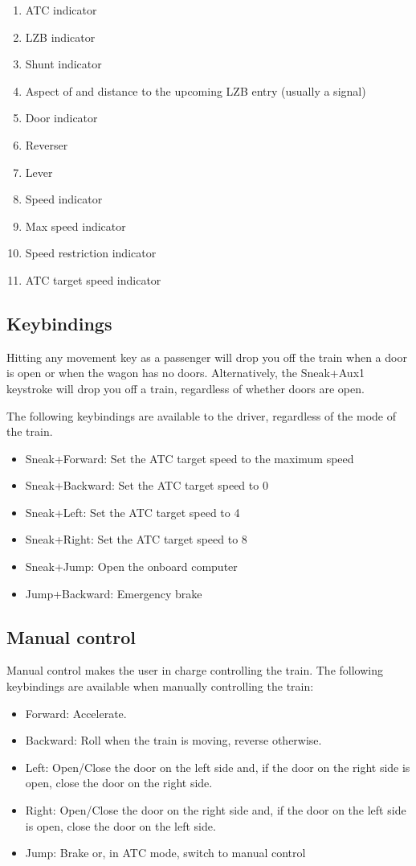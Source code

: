 \documentclass[notitlepage]{article}
\begin{document}
\begin{enumerate}
\item ATC indicator
\item LZB indicator
\item Shunt indicator
\item Aspect of and distance to the upcoming LZB entry (usually a signal)
\item Door indicator
\item Reverser
\item Lever
\item Speed indicator
\item Max speed indicator
\item Speed restriction indicator
\item ATC target speed indicator
\end{enumerate}

\subsection{Keybindings}\label{s:keybindings}
Hitting any movement key as a passenger will drop you off the train when a door is open or when the wagon has no doors. Alternatively, the Sneak+Aux1 keystroke will drop you off a train, regardless of whether doors are open.

The following keybindings are available to the driver, regardless of the mode of the train.
\begin{itemize}
\item Sneak+Forward: Set the ATC target speed to the maximum speed
\item Sneak+Backward: Set the ATC target speed to 0
\item Sneak+Left: Set the ATC target speed to 4
\item Sneak+Right: Set the ATC target speed to 8
\item Sneak+Jump: Open the onboard computer
\item Jump+Backward: Emergency brake
\end{itemize}

\subsection{Manual control}\label{s:manual-control}
Manual control makes the user in charge controlling the train. The following keybindings are available when manually controlling the train:
\begin{itemize}
\item Forward: Accelerate.
\item Backward: Roll when the train is moving, reverse otherwise.
\item Left: Open/Close the door on the left side and, if the door on the right side is open, close the door on the right side.
\item Right: Open/Close the door on the right side and, if the door on the left side is open, close the door on the left side.
\item Jump: Brake or, in ATC mode, switch to manual control
\end{itemize}
\end{document}
